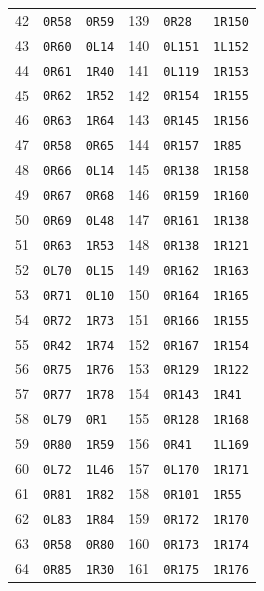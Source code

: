 \begin{longtable}{rllrll}
42 & \texttt{0R58} & \texttt{0R59} & 139 & \texttt{0R28} & \texttt{1R150} \\
43 & \texttt{0R60} & \texttt{0L14} & 140 & \texttt{0L151} & \texttt{1L152} \\
44 & \texttt{0R61} & \texttt{1R40} & 141 & \texttt{0L119} & \texttt{1R153} \\
45 & \texttt{0R62} & \texttt{1R52} & 142 & \texttt{0R154} & \texttt{1R155} \\
46 & \texttt{0R63} & \texttt{1R64} & 143 & \texttt{0R145} & \texttt{1R156} \\
47 & \texttt{0R58} & \texttt{0R65} & 144 & \texttt{0R157} & \texttt{1R85} \\
48 & \texttt{0R66} & \texttt{0L14} & 145 & \texttt{0R138} & \texttt{1R158} \\
49 & \texttt{0R67} & \texttt{0R68} & 146 & \texttt{0R159} & \texttt{1R160} \\
50 & \texttt{0R69} & \texttt{0L48} & 147 & \texttt{0R161} & \texttt{1R138} \\
51 & \texttt{0R63} & \texttt{1R53} & 148 & \texttt{0R138} & \texttt{1R121} \\
52 & \texttt{0L70} & \texttt{0L15} & 149 & \texttt{0R162} & \texttt{1R163} \\
53 & \texttt{0R71} & \texttt{0L10} & 150 & \texttt{0R164} & \texttt{1R165} \\
54 & \texttt{0R72} & \texttt{1R73} & 151 & \texttt{0R166} & \texttt{1R155} \\
55 & \texttt{0R42} & \texttt{1R74} & 152 & \texttt{0R167} & \texttt{1R154} \\
56 & \texttt{0R75} & \texttt{1R76} & 153 & \texttt{0R129} & \texttt{1R122} \\
57 & \texttt{0R77} & \texttt{1R78} & 154 & \texttt{0R143} & \texttt{1R41} \\
58 & \texttt{0L79} & \texttt{0R1} & 155 & \texttt{0R128} & \texttt{1R168} \\
59 & \texttt{0R80} & \texttt{1R59} & 156 & \texttt{0R41} & \texttt{1L169} \\
60 & \texttt{0L72} & \texttt{1L46} & 157 & \texttt{0L170} & \texttt{1R171} \\
61 & \texttt{0R81} & \texttt{1R82} & 158 & \texttt{0R101} & \texttt{1R55} \\
62 & \texttt{0L83} & \texttt{1R84} & 159 & \texttt{0R172} & \texttt{1R170} \\
63 & \texttt{0R58} & \texttt{0R80} & 160 & \texttt{0R173} & \texttt{1R174} \\
64 & \texttt{0R85} & \texttt{1R30} & 161 & \texttt{0R175} & \texttt{1R176} \\

\end{longtable}
